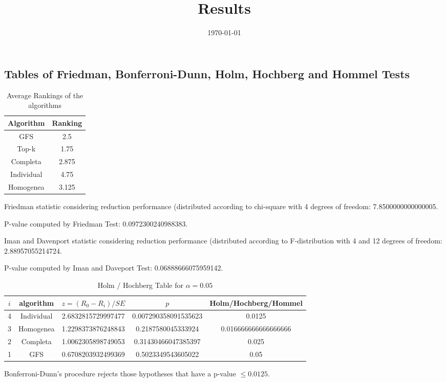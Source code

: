 \documentclass[a4paper,10pt]{article}
\title{Results}
\author{}
\date{\today}
\begin{document}
\begin{landscape}
\oddsidemargin 0in \topmargin 0in\maketitle
\section{Tables of Friedman, Bonferroni-Dunn, Holm, Hochberg and Hommel Tests}
\begin{table}[!htp]
\centering
\caption{Average Rankings of the algorithms
}\begin{tabular}{c|c}
Algorithm&Ranking\\
\hline
GFS&2.5\\
Top-k&1.75\\
Completa&2.875\\
Individual&4.75\\
Homogenea&3.125\\
\end{tabular}
\end{table}


Friedman statistic considering reduction performance (distributed according to chi-square with 4 degrees of freedom: 7.8500000000000005.


P-value computed by Friedman Test: 0.0972300240988383.\newline

Iman and Davenport statistic considering reduction performance (distributed according to F-distribution with 4 and 12 degrees of freedom: 2.88957055214724.


P-value computed by Iman and Daveport Test: 0.06888666075959142.\newline

\begin{table}[!htp]
\centering\tiny
\caption{Holm / Hochberg Table for $\alpha=0.05$}
\begin{tabular}{ccccc}
$i$&algorithm&$z=(R_0 - R_i)/SE$&$p$&Holm/Hochberg/Hommel\\
\hline
4&Individual&2.6832815729997477&0.007290358091535623&0.0125\\
3&Homogenea&1.2298373876248843&0.2187580045333924&0.016666666666666666\\
2&Completa&1.0062305898749053&0.31430466047385397&0.025\\
1&GFS&0.6708203932499369&0.5023349543605022&0.05\\
\hline
\end{tabular}
\end{table}
Bonferroni-Dunn's procedure rejects those hypotheses that have a p-value $\le0.0125$.



\end{landscape}
\end{document}
